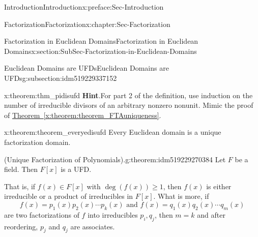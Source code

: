\documentclass[oneside,10pt,]{book}
\newcommand{\blocktitlefont}{\relax}
\newcommand{\xreffont}{\relax}
\numberwithin{equation}{section}
\renewcommand{\ge}{\geqslant}
\begin{document}
\begin{preface}{Introduction}{}{Introduction}{}{}{x:preface:Sec-Introduction}
\begin{chapterptx}{Factorization}{}{Factorization}{}{}{x:chapter:Sec-Factorization}
\begin{sectionptx}{Factorization in Euclidean Domains}{}{Factorization in Euclidean Domains}{}{}{x:section:SubSec-Factorization-in-Euclidean-Domains}
\begin{subsectionptx}{Euclidean Domains are UFDs}{}{Euclidean Domains are UFDs}{}{}{g:subsection:idm519229337152}
\begin{theorem}{}{}{x:theorem:thm_pidisufd}
\textbf{\blocktitlefont Hint}.\quad{}For part 2 of the definition, use induction on the number of irreducible divisors of an arbitrary nonzero nonunit. Mimic the proof of \hyperref[x:theorem:theorem_FTAuniqueness]{Theorem~{\xreffont\ref{x:theorem:theorem_FTAuniqueness}}}.\end{theorem}
\begin{theorem}{}{}{x:theorem:theorem_everyedisufd}%
Every Euclidean domain is a unique factorization domain.%
\end{theorem}
\begin{theorem}{(Unique Factorization of Polynomials).}{}{g:theorem:idm519229270384}%
Let \(F\) be a field. Then \(F[x]\) is a UFD.%
\par
That is, if \(f(x) \in F[x]\) with \(\deg(f(x)) \ge 1\), then \(f(x)\) is either irreducible or a product of irreducibles in \(F[x]\). What is more, if%
\begin{equation*}
f(x) = p_1(x) p_2(x) \cdots p_k(x) \text{ and }  f(x) = q_1(x) q_2(x) \cdots q_m(x)
\end{equation*}
are two factorizations of \(f\) into irreducibles \(p_i, q_j\), then \(m=k\) and after reordering, \(p_j\) and \(q_j\) are associates.%



\end{theorem}
\end{subsectionptx}
\end{sectionptx}
\end{chapterptx}
\end{preface}
\end{document}
